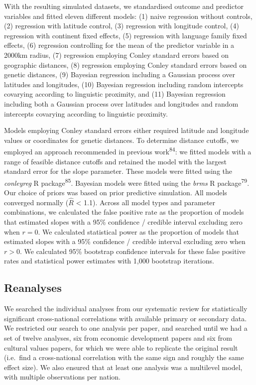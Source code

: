 \documentclass[
  man,floatsintext]{apa6}
\begin{document}
With the resulting simulated datasets, we standardised outcome and predictor variables and fitted eleven different models: (1) naive regression without controls, (2) regression with latitude control, (3) regression with longitude control, (4) regression with continent fixed effects, (5) regression with language family fixed effects, (6) regression controlling for the mean of the predictor variable in a 2000km radius, (7) regression employing Conley standard errors based on geographic distances, (8) regression employing Conley standard errors based on genetic distances, (9) Bayesian regression including a Gaussian process over latitudes and longitudes, (10) Bayesian regression including random intercepts covarying according to linguistic proximity, and (11) Bayesian regression including both a Gaussian process over latitudes and longitudes and random intercepts covarying according to linguistic proximity.

Models employing Conley standard errors either required latitude and longitude values or coordinates for genetic distances. To determine distance cutoffs, we employed an approach recommended in previous work\textsuperscript{84}: we fitted models with a range of feasible distance cutoffs and retained the model with the largest standard error for the slope parameter. These models were fitted using the \emph{conleyreg} R package\textsuperscript{85}. Bayesian models were fitted using the \emph{brms} R package\textsuperscript{79}. Our choice of priors was based on prior predictive simulation. All models converged normally (\(\hat{R}\) \textless{} 1.1). Across all model types and parameter combinations, we calculated the false positive rate as the proportion of models that estimated slopes with a 95\% confidence / credible interval excluding zero when \(r = 0\). We calculated statistical power as the proportion of models that estimated slopes with a 95\% confidence / credible interval excluding zero when \(r > 0\). We calculated 95\% bootstrap confidence intervals for these false positive rates and statistical power estimates with 1,000 bootstrap iterations.

\hypertarget{reanalyses}{%
\subsection{Reanalyses}\label{reanalyses}}

We searched the individual analyses from our systematic review for statistically significant cross-national correlations with available primary or secondary data. We restricted our search to one analysis per paper, and searched until we had a set of twelve analyses, six from economic development papers and six from cultural values papers, for which we were able to replicate the original result (i.e.~find a cross-national correlation with the same sign and roughly the same effect size). We also ensured that at least one analysis was a multilevel model, with multiple observations per nation.
\end{document}
